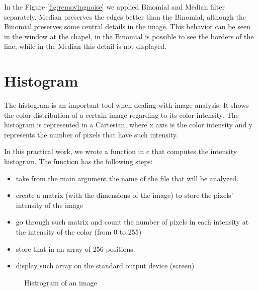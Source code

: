 \documentclass{article}
\begin{document}
	In the Figure \ref{fig:removingnoise} we applied Binomial and Median filter separately. 
	Median preserves the edges better than the Binomial, although the Binomial preserves some central details in the image. 
	This behavior can be seen in the window at the chapel, in the Binomial is possible to see the borders of the line, while in the Median this detail is not displayed. 

\section{Histogram}

	The histogram is an important tool when dealing with image analysis. It shows the color distribution of a certain image regarding to its color intensity. The 		histogram is represented in a Cartesian, where x axis is the color intensity and y represents the number of pixels that have such intensity.

	In this practical work, we wrote a function in c that computes the intensity histogram. The function has the following steps:
	\begin{itemize}
  		\item take from the main argument the name of the file that will be analyzed.
  		\item create a matrix (with the dimensions of the image) to store the pixels' intensity of the image
  		\item go through such matrix and count the number of pixels in each intensity at the intensity of the color (from 0 to 255)
  		\item store that in an array of 256 positions.
  		\item display such array on the standard output device (screen)
	\end{itemize}

	\begin{figure}[H]
	\centering
	\caption{Histrogram of an image}
	\label{fig:equalizing}
	\end{figure}
\end{document}
